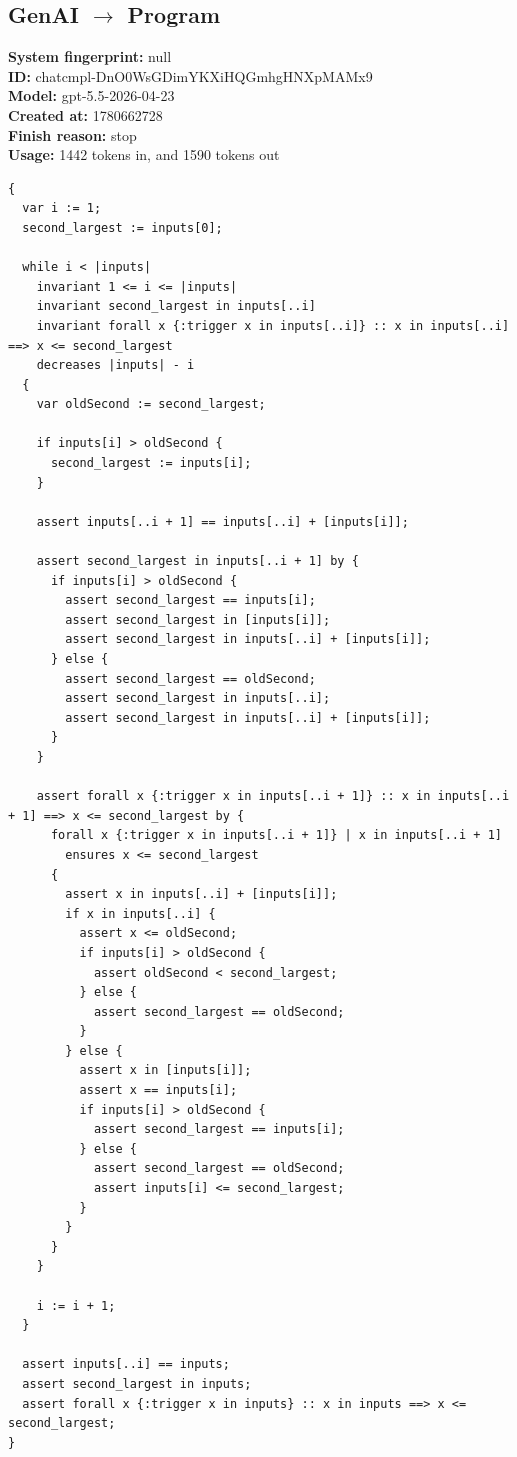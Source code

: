 \documentclass{article}
\begin{document}
\subsection*{GenAI $\rightarrow$ Program}
\textbf{System fingerprint: }null
\\\textbf{ID: }chatcmpl-DnO0WsGDimYKXiHQGmhgHNXpMAMx9
\\\textbf{Model: }gpt-5.5-2026-04-23
\\\textbf{Created at: }1780662728
\\\textbf{Finish reason: }stop
\\\textbf{Usage: }1442 tokens in, and 1590 tokens out
\begin{lstlisting}
{
  var i := 1;
  second_largest := inputs[0];

  while i < |inputs|
    invariant 1 <= i <= |inputs|
    invariant second_largest in inputs[..i]
    invariant forall x {:trigger x in inputs[..i]} :: x in inputs[..i] ==> x <= second_largest
    decreases |inputs| - i
  {
    var oldSecond := second_largest;

    if inputs[i] > oldSecond {
      second_largest := inputs[i];
    }

    assert inputs[..i + 1] == inputs[..i] + [inputs[i]];

    assert second_largest in inputs[..i + 1] by {
      if inputs[i] > oldSecond {
        assert second_largest == inputs[i];
        assert second_largest in [inputs[i]];
        assert second_largest in inputs[..i] + [inputs[i]];
      } else {
        assert second_largest == oldSecond;
        assert second_largest in inputs[..i];
        assert second_largest in inputs[..i] + [inputs[i]];
      }
    }

    assert forall x {:trigger x in inputs[..i + 1]} :: x in inputs[..i + 1] ==> x <= second_largest by {
      forall x {:trigger x in inputs[..i + 1]} | x in inputs[..i + 1]
        ensures x <= second_largest
      {
        assert x in inputs[..i] + [inputs[i]];
        if x in inputs[..i] {
          assert x <= oldSecond;
          if inputs[i] > oldSecond {
            assert oldSecond < second_largest;
          } else {
            assert second_largest == oldSecond;
          }
        } else {
          assert x in [inputs[i]];
          assert x == inputs[i];
          if inputs[i] > oldSecond {
            assert second_largest == inputs[i];
          } else {
            assert second_largest == oldSecond;
            assert inputs[i] <= second_largest;
          }
        }
      }
    }

    i := i + 1;
  }

  assert inputs[..i] == inputs;
  assert second_largest in inputs;
  assert forall x {:trigger x in inputs} :: x in inputs ==> x <= second_largest;
}
\end{lstlisting}
\end{document}
